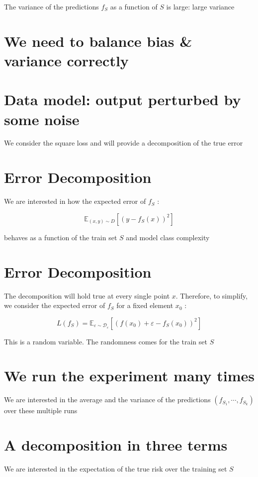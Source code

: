 The variance of the predictions $f_{S}$ as a function of $S$ is large: large variance

\section*{We need to balance bias \& variance correctly}

\section*{Data model: output perturbed by some noise}

We consider the square loss and will provide a decomposition of the true error

\section*{Error Decomposition}

We are interested in how the expected error of $f_{S}$ :

$$
\mathbb{E}_{(x, y) \sim D}\left[\left(y-f_{S}(x)\right)^{2}\right]
$$

behaves as a function of the train set $S$ and model class complexity

\section*{Error Decomposition}

The decomposition will hold true at every single point $x$. Therefore, to simplify, we consider the expected error of $f_{S}$ for a fixed element $x_{0}$ :

$$
L\left(f_{S}\right)=\mathbb{E}_{\varepsilon \sim \mathscr{D}_{\varepsilon}}\left[\left(f\left(x_{0}\right)+\varepsilon-f_{S}\left(x_{0}\right)\right)^{2}\right]
$$

This is a random variable. The randomness comes for the train set $S$

\section*{We run the experiment many times}

We are interested in the average and the variance of the predictions $\left(f_{S_{1}}, \cdots, f_{S_{k}}\right)$ over these multiple runs

\section*{A decomposition in three terms}
We are interested in the expectation of the true risk over the training set $S$

